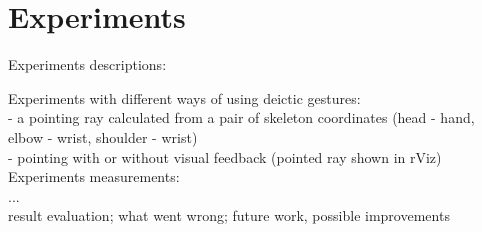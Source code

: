 \chapter{Experiments}

Experiments descriptions:

Experiments with different ways of using deictic gestures:\\
- a pointing ray calculated from a pair of skeleton coordinates (head - hand, elbow - wrist, shoulder - wrist)\\
- pointing with or without visual feedback (pointed ray shown in rViz)\\

Experiments measurements:\\
...\\

result evaluation; what went wrong; future work, possible improvements 